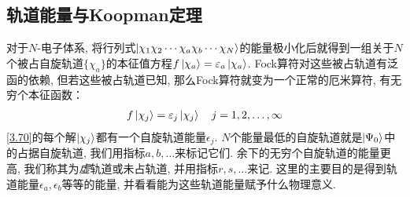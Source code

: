\subsection{轨道能量与Koopman定理}
对于$N$-电子体系, 
将行列式$\Ket{\chi_1\chi_2\cdots\chi_a\chi_b\cdots\chi_N}$的能量极小化后就得到一组关于$N$个被占自旋轨道$\{\chi_a\}$的本征值方程$f\Ket{\chi_a} = \varepsilon_a\Ket{\chi_a}$. 
Fock算符对这些被占轨道有泛函的依赖, 
但若这些被占轨道已知, 
那么Fock算符就变为一个正常的厄米算符, 
有无穷个本征函数：
\begin{align}
	\label{3.70}
	f\Ket{\chi_j} = \varepsilon_j\Ket{\chi_j}\quad j = 1,2,\ldots,\infty
\end{align}
\eqref{3.70}的每个解$\Ket{\chi_j}$都有一个自旋轨道能量$\epsilon_j$. $N$个能量最低的自旋轨道就是$\Ket{\Psi_0}$中的占据自旋轨道, 我们用指标$a,b,\ldots$来标记它们. 余下的无穷个自旋轨道的能量更高, 我们称其为\emph{虚}轨道或未占轨道, 并用指标$r,s,\ldots$来记. 这里的主要目的是得到轨道能量$\epsilon_a,\epsilon_b$等等的能量, 并看看能为这些轨道能量赋予什么物理意义.

